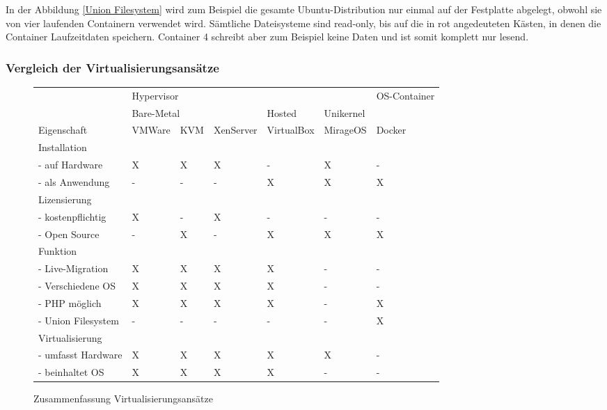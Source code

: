 In der Abbildung \ref{Union Filesystem} wird zum Beispiel die gesamte Ubuntu-Distribution nur einmal auf der Festplatte abgelegt, obwohl sie von vier laufenden Containern verwendet wird. Sämtliche Dateisysteme sind read-only, bis auf die in rot angedeuteten Kästen, in denen die Container Laufzeitdaten speichern. Container 4 schreibt aber zum Beispiel keine Daten und ist somit komplett nur lesend.

\subsubsection{Vergleich der Virtualisierungsansätze}

\begin{figure}[!ht]
  \begin{center}
    \resizebox{15cm}{!} {
      \begin{tabular}{|l|l|l|l|l|l|l|}
      \hline
      {} & \multicolumn{5}{|l|}{Hypervisor} & OS-Container \\
      \cline{2-6}
      {} & \multicolumn{3}{|l|}{Bare-Metal} & Hosted & Unikernel & {} \\
      \hline
      Eigenschaft & VMWare & KVM & XenServer & VirtualBox & MirageOS & Docker \\
      \hline
      Installation & \multicolumn{6}{|l|}{} \\
      \hline
      - auf Hardware & X & X & X & - & X & - \\
      \hline
      - als Anwendung & - & - & - & X & X & X \\
      \hline
      Lizensierung & \multicolumn{6}{|l|}{} \\
      \hline
      - kostenpflichtig & X & - & X & - & - & - \\
      \hline
      - Open Source & - & X & - & X & X & X \\
      \hline
      Funktion & \multicolumn{6}{|l|}{} \\
      \hline
      - Live-Migration & X & X & X & X & - & - \\
      \hline
      - Verschiedene OS & X & X & X & X & - & - \\
      \hline
      - PHP möglich & X & X & X & X & - & X \\
      \hline
      - Union Filesystem & - & - & - & - & - & X \\
      \hline
      Virtualisierung & \multicolumn{6}{|l|}{} \\
      \hline
      - umfasst Hardware & X & X & X & X & X & - \\
      \hline
      - beinhaltet OS & X & X & X & X & - & - \\      
      \hline
      \end{tabular}
    }
    \caption{Zusammenfassung Virtualisierungsansätze}
  \end{center}
\end{figure}


